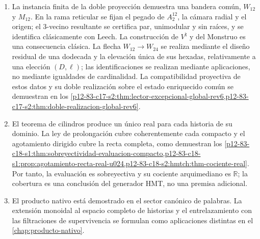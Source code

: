 \begin{enumerate}
\item La instancia finita de la doble proyección demuestra una bandera común,
\(W_{12}\) y \(M_{12}\). En la rama reticular se fijan el pegado de
\(A_2^{12}\), la cámara radial y el origen; el 3-vecino resultante se certifica
par, unimodular y sin raíces, y se identifica clásicamente con Leech. La
construcción de \(V^\natural\) y del Monstruo es una consecuencia clásica. La
flecha \(W_{12}\to W_{24}\) se realiza mediante el diseño residual de una
dodecada y la elevación única de sus hexadas, relativamente a una elección
\((D,\ell)\); las identificaciones se realizan mediante aplicaciones, no
mediante igualdades de cardinalidad. La compatibilidad proyectiva de estos
datos y su doble realización sobre el estado enriquecido común se demuestran
en los
\cref{p12-83-c17-s2:thm:lector-excepcional-global-rev6,p12-83-c17-s2:thm:doble-realizacion-global-rev6}.

\item El teorema de cilindros produce un único real para cada historia de su
dominio. La ley de prolongación cubre coherentemente cada compacto y el
agotamiento dirigido cubre la recta completa, como demuestran los
\cref{p12-83-c18-s1:thm:sobreyectividad-evaluacion-compacto,p12-83-c18-s1:prop:agotamiento-recta-real-u024,p12-83-c18-s2:hmtch:thm-cociente-real}.
Por tanto, la evaluación es sobreyectiva y su cociente arquimediano es
\(\mathbb R\); la cobertura es una conclusión del generador HMT, no una
premisa adicional.

\item El producto nativo está demostrado en el sector canónico de palabras.
La extensión monoidal al espacio completo de historias y el entrelazamiento
con las filtraciones de supervivencia se formulan como aplicaciones distintas
en el \cref{chap:producto-nativo}.
\end{enumerate}
